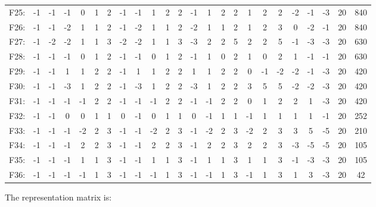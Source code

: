 \documentclass[12pt]{article}
\begin{document}
\begin{center}
\begin{tabular}{cccccccccccccccccccccc|c|c}
F25:&-1&-1&-1&0&1&2&-1&-1&1&2&2&-1&1&2&2&1&2&2&-2&-1&-3&20&840\\
F26:&-1&-1&-2&1&1&2&-1&-2&1&1&2&-2&1&1&2&1&2&3&0&-2&-1&20&840\\
F27:&-1&-2&-2&1&1&3&-2&-2&1&1&3&-3&2&2&5&2&2&5&-1&-3&-3&20&630\\
F28:&-1&-1&-1&0&1&2&-1&-1&0&1&2&-1&1&0&2&1&0&2&1&-1&-1&20&630\\
F29:&-1&-1&1&1&2&2&-1&1&1&2&2&1&1&2&2&0&-1&-2&-2&-1&-3&20&420\\
F30:&-1&-1&-3&1&2&2&-1&-3&1&2&2&-3&1&2&2&3&5&5&-2&-2&-3&20&420\\
F31:&-1&-1&-1&-1&2&2&-1&-1&-1&2&2&-1&-1&2&2&0&1&2&2&1&-3&20&420\\
F32:&-1&-1&0&0&1&1&0&-1&0&1&1&0&-1&1&1&-1&1&1&1&1&-1&20&252\\
F33:&-1&-1&-1&-2&2&3&-1&-1&-2&2&3&-1&-2&2&3&-2&2&3&3&5&-5&20&210\\
F34:&-1&-1&-1&2&2&3&-1&-1&2&2&3&-1&2&2&3&2&2&3&-3&-5&-5&20&105\\
F35:&-1&-1&-1&1&1&3&-1&-1&1&1&3&-1&1&1&3&1&1&3&-1&-3&-3&20&105\\
F36:&-1&-1&-1&-1&1&3&-1&-1&-1&1&3&-1&-1&1&3&-1&1&3&1&3&-3&20&42\\
\end{tabular}
\end{center}
The representation matrix is:
\end{document}
